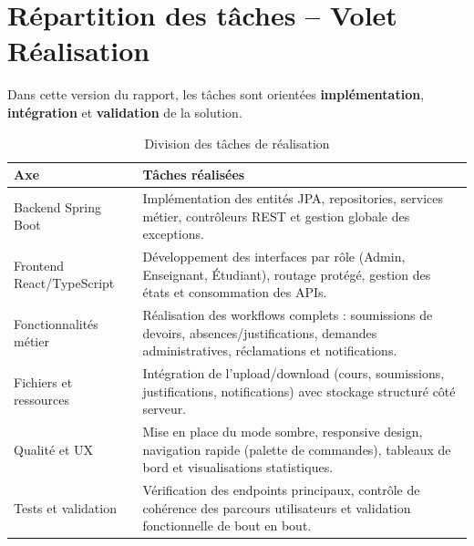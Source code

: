 \section*{Répartition des tâches -- Volet Réalisation}

Dans cette version du rapport, les tâches sont orientées \textbf{implémentation}, \textbf{intégration} et \textbf{validation} de la solution.

\begin{table}[H]
\centering
\caption{Division des tâches de réalisation}
\label{tab:taches_realisation}
\begin{tabularx}{\textwidth}{lX}
\toprule
\textbf{Axe} & \textbf{Tâches réalisées} \\
\midrule
Backend Spring Boot & Implémentation des entités JPA, repositories, services métier, contrôleurs REST et gestion globale des exceptions. \\
Frontend React/TypeScript & Développement des interfaces par rôle (Admin, Enseignant, Étudiant), routage protégé, gestion des états et consommation des APIs. \\
Fonctionnalités métier & Réalisation des workflows complets : soumissions de devoirs, absences/justifications, demandes administratives, réclamations et notifications. \\
Fichiers et ressources & Intégration de l'upload/download (cours, soumissions, justifications, notifications) avec stockage structuré côté serveur. \\
Qualité et UX & Mise en place du mode sombre, responsive design, navigation rapide (palette de commandes), tableaux de bord et visualisations statistiques. \\
Tests et validation & Vérification des endpoints principaux, contrôle de cohérence des parcours utilisateurs et validation fonctionnelle de bout en bout. \\
\bottomrule
\end{tabularx}
\end{table}

\newpage
